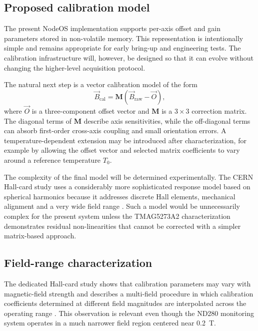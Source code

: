 \subsection{Proposed calibration model}

The present NodeOS implementation supports per-axis offset and gain parameters stored in non-volatile memory. This representation is intentionally simple and remains appropriate for early bring-up and engineering tests. The calibration infrastructure will, however, be designed so that it can evolve without changing the higher-level acquisition protocol.

The natural next step is a vector calibration model of the form
\begin{equation}
\vec{B}_{\mathrm{cal}} = \mathbf{M}\left(\vec{B}_{\mathrm{raw}}-\vec{O}\right),
\label{eq:nd280_vector_calibration}
\end{equation}
where $\vec{O}$ is a three-component offset vector and $\mathbf{M}$ is a $3\times3$ correction matrix. The diagonal terms of $\mathbf{M}$ describe axis sensitivities, while the off-diagonal terms can absorb first-order cross-axis coupling and small orientation errors. A temperature-dependent extension may be introduced after characterization, for example by allowing the offset vector and selected matrix coefficients to vary around a reference temperature $T_0$.

The complexity of the final model will be determined experimentally. The CERN Hall-card study uses a considerably more sophisticated response model based on spherical harmonics because it addresses discrete Hall elements, mechanical alignment and a very wide field range \cite{MessnerHallCalibration}. Such a model would be unnecessarily complex for the present system unless the TMAG5273A2 characterization demonstrates residual non-linearities that cannot be corrected with a simpler matrix-based approach.

\subsection{Field-range characterization}

The dedicated Hall-card study shows that calibration parameters may vary with magnetic-field strength and describes a multi-field procedure in which calibration coefficients determined at different field magnitudes are interpolated across the operating range \cite{MessnerHallCalibration}. This observation is relevant even though the ND280 monitoring system operates in a much narrower field region centered near \SI{0.2}{T}.

